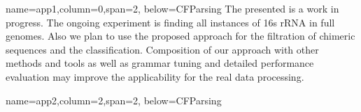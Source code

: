 \documentclass[a0paper,portrait]{baposter}
\begin{document}
\begin{poster}
{name=app1,column=0,span=2, below=CFParsing}
{ 
The presented is a work in progress. 
The ongoing experiment is finding all instances of 16s rRNA in full genomes.
Also we plan to use the proposed approach for the filtration of chimeric sequences and the classification.
Composition of our approach with other methods and tools as well as grammar tuning and detailed performance evaluation may improve the applicability for the real data processing.
}


{name=app2,column=2,span=2, below=CFParsing}
{
\smaller %
\renewcommand{\section}[2]{\vskip 0.05em} %


%
}



    


\end{poster}
\end{document}
